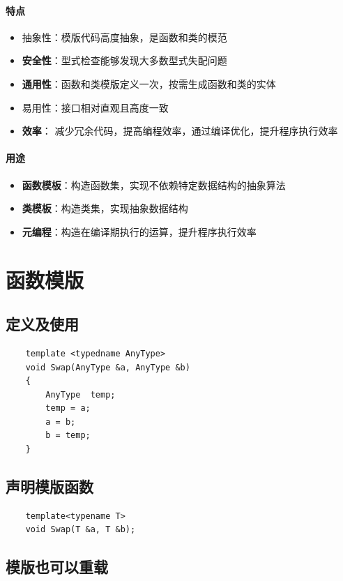 \documentclass[UTF8,a4paper,12pt]{ctexbook}
\begin{document}
 
	 \paragraph{特点}
		 \begin{itemize}
			 \item 抽象性：模版代码高度抽象，是函数和类的模范
			 \item \textbf{安全性}：型式检查能够发现大多数型式失配问题
			 \item \textbf{通用性}：函数和类模版定义一次，按需生成函数和类的实体
			 \item 易用性：接口相对直观且高度一致
			 \item \textbf{效率}： 减少冗余代码，提高编程效率，通过编译优化，提升程序执行效率
		 \end{itemize}
	
	\paragraph{用途}
		\begin{itemize}
			\item \textbf{函数模板}：构造函数集，实现不依赖特定数据结构的抽象算法
			\item \textbf{类模板}：构造类集，实现抽象数据结构
			\item \textbf{元编程}：构造在编译期执行的运算，提升程序执行效率
		\end{itemize}	 
		
\section{函数模版}
	\subsection{定义及使用}
			\begin{lstlisting}
	template <typedname AnyType>
	void Swap(AnyType &a, AnyType &b)
	{
		AnyType  temp;
		temp = a;
		a = b;
		b = temp;
	}			
			\end{lstlisting}
			
	\subsection{声明模版函数}
		\begin{lstlisting}			
	template<typename T>
	void Swap(T &a, T &b);			
		\end{lstlisting}
			
	\subsection{模版也可以重载}
			
\end{document}

